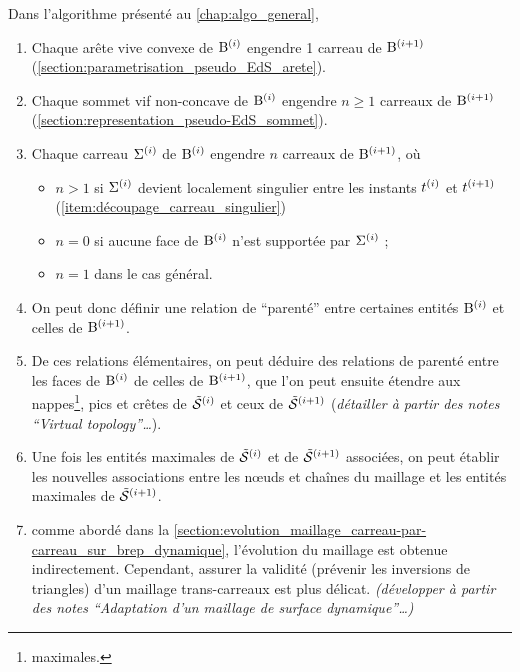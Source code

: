 Dans l'algorithme présenté au \autoref{chap:algo_general}, 
\begin{enumerate}
	\item Chaque arête vive convexe de $\mathrm{B}^{(i)}$ engendre 1 carreau de $\mathrm{B}^{(i+1)}$ (\cf \autoref{section:parametrisation_pseudo_EdS_arete}). 
	\item Chaque sommet vif non-concave de $\mathrm{B}^{(i)}$ engendre $n \geq 1$ carreaux de $\mathrm{B}^{(i+1)}$ (\cf \autoref{section:representation_pseudo-EdS_sommet}).
	\item Chaque carreau $\Sigma^{(i)}$ de $\mathrm{B}^{(i)}$ engendre $n$ carreaux de $\mathrm{B}^{(i+1)}$, où
	\begin{itemize}
		\item $n > 1$ si $\Sigma^{(i)}$ devient localement singulier entre les instants $t^{(i)}$ et $t^{(i+1)}$ (\cf \autoref{item:découpage_carreau_singulier})
		\item $n = 0$ si aucune face de $\mathrm{B}^{(i)}$ n'est supportée par $\Sigma^{(i)}$ ;
		\item $n = 1$ dans le cas général.
	\end{itemize}
	
	\item On peut donc définir une relation de ``parenté'' entre certaines entités $\mathrm{B}^{(i)}$ et celles de $\mathrm{B}^{(i+1)}$.
	
	\item De ces relations élémentaires, on peut déduire des relations de parenté entre les faces de $\mathrm{B}^{(i)}$ de celles de $\mathrm{B}^{(i+1)}$, que l'on peut ensuite étendre aux nappes\footnote{maximales.\label{foot:maximal}}, pics et crêtes de $\tilde{\mathcal{S}}^{(i)}$ et ceux de $\tilde{\mathcal{S}}^{(i+1)}$ (\textit{détailler à partir des notes ``Virtual topology''\ldots}).
	
	\item Une fois les entités maximales de $\tilde{\mathcal{S}}^{(i)}$ et de $\tilde{\mathcal{S}}^{(i+1)}$ associées, on peut établir les nouvelles associations entre les n\oe uds et chaînes du maillage et les entités maximales de $\tilde{\mathcal{S}}^{(i+1)}$. 
	
	\item comme abordé dans la \autoref{section:evolution_maillage_carreau-par-carreau_sur_brep_dynamique}, l'évolution du maillage est obtenue indirectement.
	Cependant, assurer la validité (\ie prévenir les inversions de triangles) d'un maillage trans-carreaux est plus délicat.
	\textit{(développer à partir des notes ``Adaptation d'un maillage de surface dynamique''\ldots)}


\end{enumerate}
